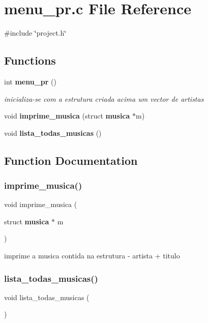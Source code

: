 \section{menu\+\_\+pr.\+c File Reference}
\label{menu__pr_8c}
{\ttfamily \#include \char`\"{}project.\+h\char`\"{}}\newline
\subsection*{Functions}
\begin{DoxyCompactItemize}
\item 
int \textbf{ menu\+\_\+pr} ()
\begin{DoxyCompactList}\small\item\em inicializa-\/se com a estrutura criada acima um vector de artistas \end{DoxyCompactList}\item 
void \textbf{ imprime\+\_\+musica} (struct \textbf{ musica} $\ast$m)
\item 
void \textbf{ lista\+\_\+todas\+\_\+musicas} ()
\end{DoxyCompactItemize}


\subsection{Function Documentation}
\mbox{\label{menu__pr_8c_a94eb2f196131602051af1a66e7974225}} 
\subsubsection{imprime\_musica()}
{\footnotesize\ttfamily void imprime\+\_\+musica (\begin{DoxyParamCaption}\item[{struct \textbf{ musica} $\ast$}]{m }\end{DoxyParamCaption})}

imprime a musica contida na estrutura -\/ artista + titulo \mbox{\label{menu__pr_8c_a44ba4b9e88b997f3011edeb8b9742eca}} 
\subsubsection{lista\_todas\_musicas()}
{\footnotesize\ttfamily void lista\+\_\+todas\+\_\+musicas (\begin{DoxyParamCaption}{ }\end{DoxyParamCaption})}


